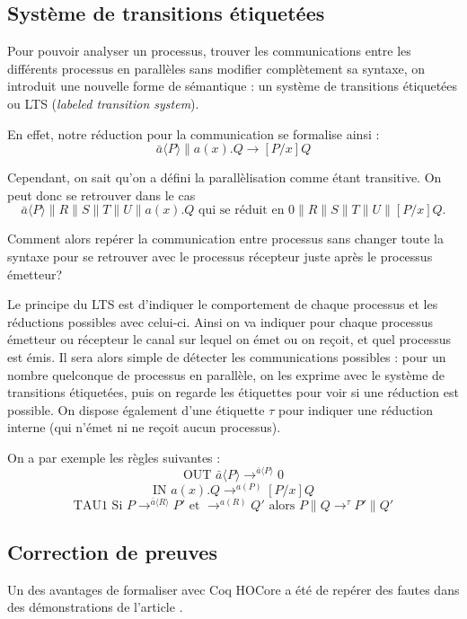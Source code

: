 \documentclass[11pt]{article}
\begin{document}
\subsection{Système de transitions étiquetées} %
Pour pouvoir analyser un processus, trouver les communications entre les différents processus en parallèles sans modifier complètement sa syntaxe, on introduit une nouvelle forme de sémantique : un système de transitions étiquetées ou LTS (\textit{labeled transition system}). 

En effet, notre réduction pour la communication se formalise ainsi :
$$\bar{a}\langle P\rangle\|a(x).Q \rightarrow [P/x]Q$$

Cependant, on sait qu'on a défini la parallèlisation comme étant transitive. On peut donc se retrouver dans le cas
$$\bar{a}\langle P\rangle\|R\|S\|T\|U\|a(x).Q \text{ qui se réduit en } 0\|R\|S\|T\|U\|[P/x]Q.$$

Comment alors repérer la communication entre processus sans changer toute la syntaxe pour se retrouver avec le processus récepteur juste après le processus émetteur?

Le principe du LTS est d'indiquer le comportement de chaque processus et les réductions possibles avec celui-ci. Ainsi on va indiquer pour chaque processus émetteur ou récepteur le canal sur lequel on émet ou on reçoit, et quel processus est émis. Il sera alors simple de détecter les communications possibles : pour un nombre quelconque de processus en parallèle, on les exprime avec le système de transitions étiquetées, puis on regarde les étiquettes pour voir si une réduction est possible. On dispose également d'une étiquette $\tau$ pour indiquer une réduction interne (qui n'émet ni ne reçoit aucun processus).

On a par exemple les règles suivantes : 
$$\text{OUT } \bar{a}\langle P\rangle \rightarrow^{\bar{a}\langle P\rangle} 0$$
$$\text{IN } a(x).Q \rightarrow^{a(P)}[P/x]Q$$
$$\text{TAU1 Si } P\rightarrow^{\bar{a}\langle R\rangle} P' \text{ et } \rightarrow^{a(R)} Q' \text{ alors } P\|Q \rightarrow^{\tau} P'\|Q'$$
\subsection{Correction de preuves}
Un des avantages de formaliser avec Coq HOCore a été de repérer des fautes dans des démonstrations de l'article \cite{expressiveness}.
\end{document}
